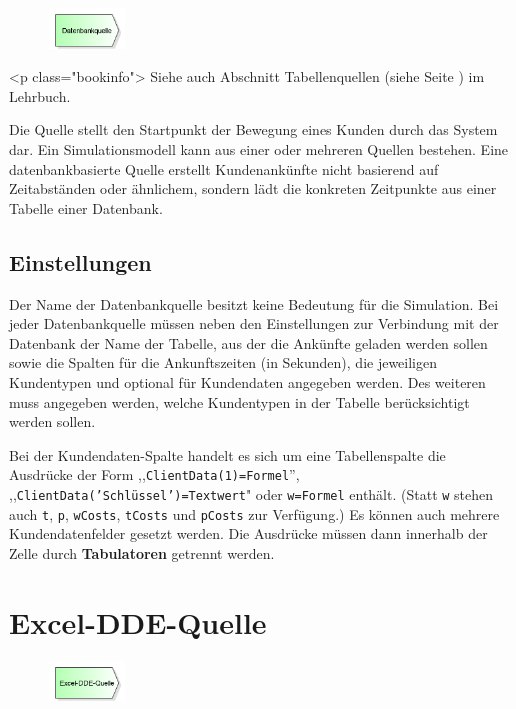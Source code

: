 \begin{figure}
\vspace{-22pt}
\includegraphics[width=2cm]{imageModelElementSourceDB.png}
\vspace{-22pt}
\end{figure}

<p class="bookinfo">
Siehe auch Abschnitt Tabellenquellen (siehe Seite \pageref{ref:book:9.3.1}) im Lehrbuch.

Die Quelle stellt den Startpunkt der Bewegung eines Kunden durch das System dar.
Ein Simulationsmodell kann aus einer oder mehreren Quellen bestehen.
Eine datenbankbasierte Quelle erstellt Kundenankünfte nicht basierend auf
Zeitabständen oder ähnlichem, sondern lädt die konkreten Zeitpunkte aus einer
Tabelle einer Datenbank.

\subsection*{Einstellungen}

Der Name der Datenbankquelle besitzt keine Bedeutung für die Simulation.
Bei jeder Datenbankquelle müssen neben den Einstellungen zur Verbindung mit
der Datenbank der Name der Tabelle, aus der die Ankünfte geladen werden sollen
sowie die Spalten für die Ankunftszeiten (in Sekunden), die jeweiligen Kundentypen
und optional für Kundendaten angegeben werden. Des weiteren muss angegeben werden,
welche Kundentypen in der Tabelle berücksichtigt werden sollen.

Bei der Kundendaten-Spalte handelt es sich um eine Tabellenspalte die Ausdrücke
der Form ,,\texttt{ClientData(1)=Formel}'', ,,\texttt{ClientData('Schlüssel')=Textwert}"
oder \texttt{w=Formel} enthält. (Statt \texttt{w} stehen auch \texttt{t}, \texttt{p},
\texttt{wCosts}, \texttt{tCosts} und \texttt{pCosts} zur Verfügung.)
Es können auch mehrere Kundendatenfelder gesetzt werden.
Die Ausdrücke müssen dann innerhalb der Zelle durch \textbf{Tabulatoren} getrennt werden. 


\section{Excel-DDE-Quelle}
\label{ref:ModelElementSourceDDE}

\begin{figure}
\vspace{-22pt}
\includegraphics[width=2cm]{imageModelElementSourceDDE.png}
\vspace{-22pt}
\end{figure}

